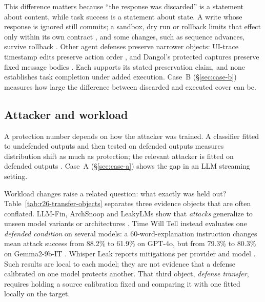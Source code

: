 This difference matters because ``the response was discarded'' is a statement about content, while task success is a statement about state. A write whose response is ignored still commits; a sandbox, dry run or rollback limits that effect only within its own contract \cite{kubernetesdryrun,stripesandboxes,postgresrollback}, and some changes, such as sequence advances, survive rollback \cite{postgressequences}. Other agent defenses preserve narrower objects: UI-trace timestamp edits preserve action order \cite{uitraces2026}, and Dangol's protected captures preserve fixed message bodies \cite{dangol2026workflow}. Each supports its stated preservation claim, and none establishes task completion under added execution. Case~B (\S\ref{sec:case-b}) measures how large the difference between discarded and executed cover can be.


\subsection{Attacker and workload}\label{sec:attacker}\label{sec:evaluation}
A protection number depends on how the attacker was trained. A classifier fitted to undefended outputs and then tested on defended outputs measures distribution shift as much as protection; the relevant attacker is fitted on defended outputs \cite{tramer2020adaptive,juarez2014critical}. Case~A (\S\ref{sec:case-a}) shows the gap in an LLM streaming setting.

Workload changes raise a related question: what exactly was held out? Table~\ref{tab:r26-transfer-objects} separates three evidence objects that are often conflated. LLM-Fin, ArchSnoop and LeakyLMs show that \emph{attacks} generalize to unseen model variants or architectures \cite{nazari2024llmfin,weng2026archsnoop,majidi2026leakylms}. Time Will Tell instead evaluates one \emph{defended condition} on several models: a 60-word-explanation instruction changes mean attack success from 88.2\% to 61.9\% on GPT-4o, but from 79.3\% to 80.3\% on Gemma2-9b-IT \cite[VII-B]{timewilltell2024}. Whisper Leak reports mitigations per provider and model \cite[3.2,6]{whisperleak2025}. Such results are local to each model; they are not evidence that a defense calibrated on one model protects another. That third object, \emph{defense transfer}, requires holding a source calibration fixed and comparing it with one fitted locally on the target.


